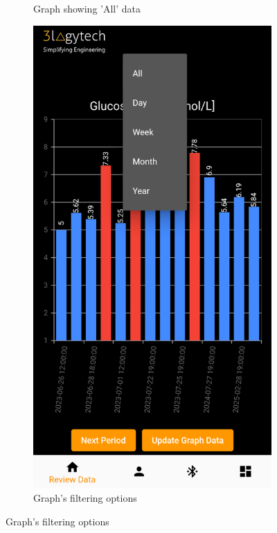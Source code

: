 \documentclass[a4paper]{scrreprt}
\begin{document}
\begin{figure}[h]
\begin{subfigure}{0.45\textwidth}
        \caption{Graph showing 'All' data}
        \label{fig:graph1}
    \end{subfigure}
    \begin{subfigure}{0.45\textwidth}
        \centering
        \includegraphics[scale=0.5]{graph_filter-options.png}
        \caption{Graph's filtering options}
        \label{fig:graph2}
    \end{subfigure}
\end{figure}
\end{document}
